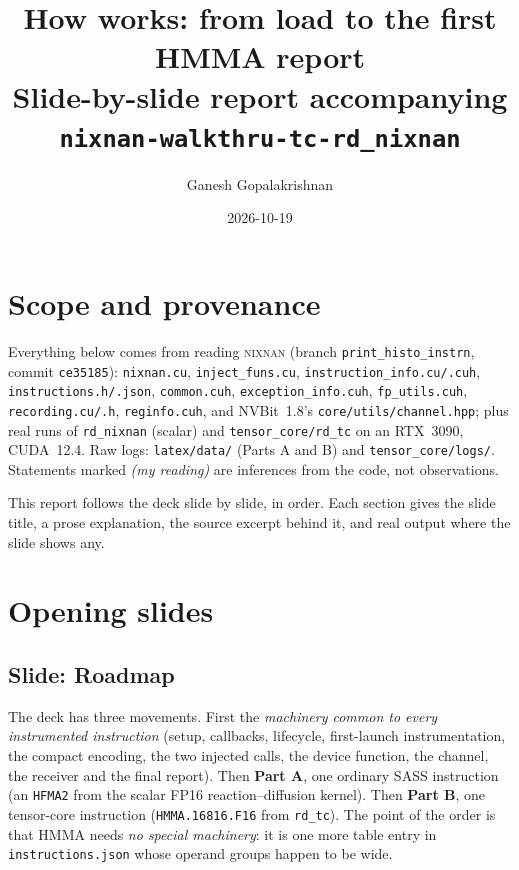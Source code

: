 \documentclass[11pt]{article}
\title{How \nn{} works: from load to the first HMMA report\\\large Slide-by-slide report accompanying \texttt{nixnan-walkthru-tc-rd\_nixnan}}
\author{Ganesh Gopalakrishnan}
\date{2026-10-19}
\newcommand{\nn}{\textsc{nixnan}}
\newcommand{\slide}[1]{\subsection*{Slide: #1}\addcontentsline{toc}{subsection}{#1}}
\begin{document}
\maketitle\tableofcontents
\section*{Scope and provenance}
Everything below comes from reading \nn{} (branch \texttt{print\_histo\_instrn}, commit \texttt{ce35185}): \texttt{nixnan.cu}, \texttt{inject\_funs.cu}, \texttt{instruction\_info.cu/.cuh}, \texttt{instructions.h/.json}, \texttt{common.cuh}, \texttt{exception\_info.cuh}, \texttt{fp\_utils.cuh}, \texttt{recording.cu/.h}, \texttt{reginfo.cuh}, and NVBit~1.8's \texttt{core/utils/channel.hpp}; plus real runs of \texttt{rd\_nixnan} (scalar) and \texttt{tensor\_core/rd\_tc} on an RTX~3090, CUDA~12.4. Raw logs: \texttt{latex/data/} (Parts A and B) and \texttt{tensor\_core/logs/}. Statements marked \emph{(my reading)} are inferences from the code, not observations.

This report follows the deck slide by slide, in order. Each section gives the slide title, a prose explanation, the source excerpt behind it, and real output where the slide shows any.

\section{Opening slides}
\slide{Roadmap}
The deck has three movements. First the \emph{machinery common to every instrumented instruction} (setup, callbacks, lifecycle, first-launch instrumentation, the compact encoding, the two injected calls, the device function, the channel, the receiver and the final report). Then \textbf{Part A}, one ordinary SASS instruction (an \texttt{HFMA2} from the scalar FP16 reaction--diffusion kernel). Then \textbf{Part B}, one tensor-core instruction (\texttt{HMMA.16816.F16} from \texttt{rd\_tc}). The point of the order is that HMMA needs \emph{no special machinery}: it is one more table entry in \texttt{instructions.json} whose operand groups happen to be wide.
\end{document}
